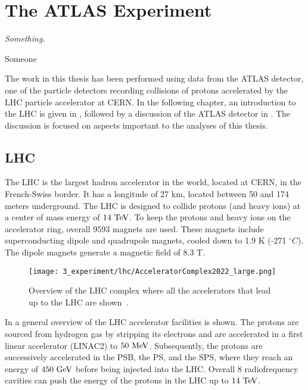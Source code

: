 \chapter{The ATLAS Experiment}
\label{ch:atlas}

\epigraph{\emph{Something.}}{Someone}

The work in this thesis has been performed using data from the \ac{ATLAS} detector, one of the particle detectors recording collisions of protons accelerated by the \ac{LHC} particle accelerator at \ac{CERN}. 
In the following chapter, an introduction to the \ac{LHC} is given in \Sect{\ref{sec:atlas:LHC}}, followed by a discussion of the \ac{ATLAS} detector in \Sect{\ref{sec:atlas:atlas}}. The discussion is focused on aspects important to the analyses of this thesis.






\section{LHC}
\label{sec:atlas:LHC}

The \ac{LHC} \cite{LHC-TDR,LHC-Machine} is the largest hadron accelerator in the world, located at \ac{CERN}, in the French-Swiss border. It has a longitude of 27 km, located between 50 and 174 meters underground.
The \ac{LHC} is designed to collide protons (and heavy ions) at a center of mass energy of \(14~\text{TeV}\). To keep the protons and heavy ions on the accelerator ring, overall 9593 magnets are used. These magnets include superconducting dipole and quadrupole magnets, cooled down to 1.9 K (-271 $^{\circ} C$). The dipole magnets generate a magnetic field of 8.3 T.

\begin{figure}[ht!]
    \centering
    \texttt{[image: 3\_experiment/lhc/AcceleratorComplex2022\_large.png]}
    \caption{Overview of the \ac{LHC} complex where all the accelerators that lead up to the \ac{LHC} are shown~\cite{LHC-complex}.}
    \label{fig:atlas:lhc:lhc}
\end{figure}

In \Fig{\ref{fig:atlas:lhc:lhc}} a general overview of the \ac{LHC} accelerator facilities is shown. The protons are sourced from hydrogen gas by stripping its electrons and are accelerated in a first linear accelerator (LINAC2) to \(50~\text{MeV}\). Subsequently, the protons are successively accelerated in the \ac{PSB}, the \ac{PS}, and the \ac{SPS}, where they reach an energy of \(450~\text{GeV}\) before being injected into the \ac{LHC}.  Overall 8 radiofrequency cavities can push the energy of the protons in the \ac{LHC} up to \(14~\text{TeV}\).

